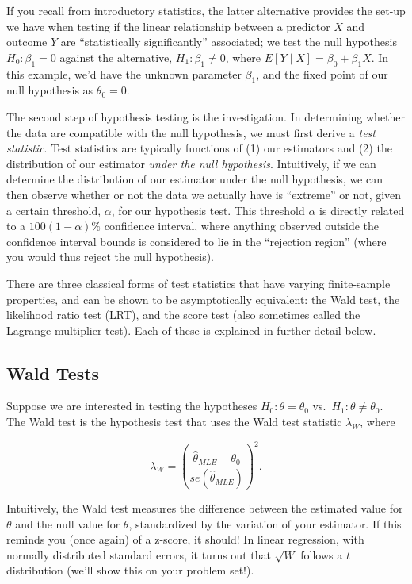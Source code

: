 \documentclass[
  letterpaper,
  DIV=11,
  numbers=noendperiod]{scrreprt}
\begin{document}
If you recall from introductory statistics, the latter alternative
provides the set-up we have when testing if the linear relationship
between a predictor \(X\) and outcome \(Y\) are ``statistically
significantly'' associated; we test the null hypothesis
\(H_0: \beta_1 = 0\) against the alternative, \(H_1: \beta_1 \neq 0\),
where \(E[Y \mid X] = \beta_0 + \beta_1 X\). In this example, we'd have
the unknown parameter \(\beta_1\), and the fixed point of our null
hypothesis as \(\theta_0 = 0\).

The second step of hypothesis testing is the investigation. In
determining whether the data are compatible with the null hypothesis, we
must first derive a \emph{test statistic}. Test statistics are typically
functions of (1) our estimators and (2) the distribution of our
estimator \emph{under the null hypothesis}. Intuitively, if we can
determine the distribution of our estimator under the null hypothesis,
we can then observe whether or not the data we actually have is
``extreme'' or not, given a certain threshold, \(\alpha\), for our
hypothesis test. This threshold \(\alpha\) is directly related to a
\(100(1 - \alpha)\%\) confidence interval, where anything observed
outside the confidence interval bounds is considered to lie in the
``rejection region'' (where you would thus reject the null hypothesis).

There are three classical forms of test statistics that have varying
finite-sample properties, and can be shown to be asymptotically
equivalent: the Wald test, the likelihood ratio test (LRT), and the
score test (also sometimes called the Lagrange multiplier test). Each of
these is explained in further detail below.

\subsection*{Wald Tests}\label{wald-tests}

Suppose we are interested in testing the hypotheses
\(H_0: \theta = \theta_0\) vs.~\(H_1: \theta \neq \theta_0\). The Wald
test is the hypothesis test that uses the Wald test statistic
\(\lambda_{W}\), where

\[
\lambda_W = \left( \frac{\hat{\theta}_{MLE} - \theta_0}{se(\hat{\theta}_{MLE})}\right)^2.
\]

Intuitively, the Wald test measures the difference between the estimated
value for \(\theta\) and the null value for \(\theta\), standardized by
the variation of your estimator. If this reminds you (once again) of a
z-score, it should! In linear regression, with normally distributed
standard errors, it turns out that \(\sqrt{W}\) follows a \(t\)
distribution (we'll show this on your problem set!).
\end{document}
